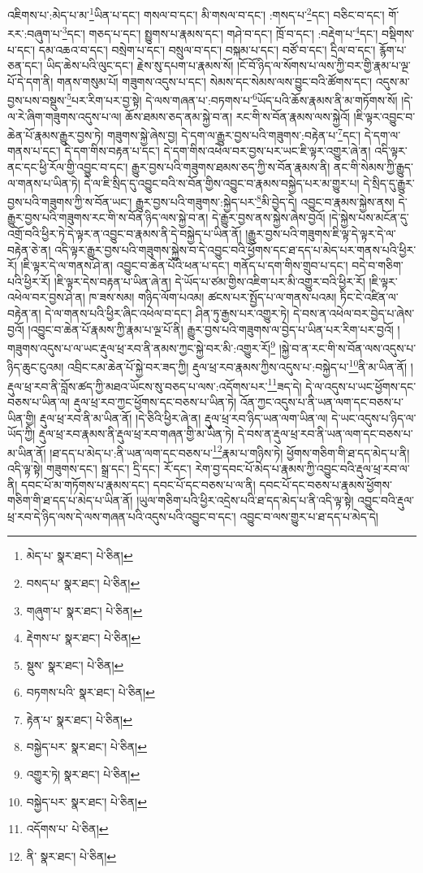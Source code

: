 འཇིགས་པ་:མེད་པ་མ་\footnote{མེད་པ་  སྣར་ཐང་།  པེ་ཅིན། }ཡིན་པ་དང་། གསལ་བ་དང་། མི་གསལ་བ་དང་། :གསད་པ་\footnote{བསད་པ་  སྣར་ཐང་།  པེ་ཅིན། }དང་། བཅིང་བ་དང་། གོ་རར་:བཞུག་པ་\footnote{གཞུག་པ་  སྣར་ཐང་།  པེ་ཅིན། }དང་། གཅད་པ་དང་། སྤྱུགས་པ་རྣམས་དང་། གཤེ་བ་དང་། ཁྲོ་བ་དང་། :བརྡེག་པ་\footnote{རྡེགས་པ་  སྣར་ཐང་།  པེ་ཅིན། }དང་། བསྡིགས་པ་དང་། དམ་འཆའ་བ་དང་། བསྲེག་པ་དང་། བསྲུལ་བ་དང་། བསྐམ་པ་དང་། བཙོ་བ་དང་། དྲིལ་བ་དང་། རྙོག་པ་ཅན་དང་། ཡིད་ཆེས་པའི་ལུང་དང་། རྗེས་སུ་དཔག་པ་རྣམས་སོ། །ངོ་བོ་ཉིད་ལ་སོགས་པ་ལས་ཀྱི་བར་གྱི་རྣམ་པ་ལྔ་པོ་དེ་དག་ནི། གནས་གསུམ་པོ། གཟུགས་འདུས་པ་དང་། སེམས་དང་སེམས་ལས་བྱུང་བའི་ཚོགས་དང་། འདུས་མ་བྱས་པས་བསྡུས་\footnote{སྡུས་  སྣར་ཐང་།  པེ་ཅིན། }པར་རིག་པར་བྱ་སྟེ། དེ་ལས་གཞན་པ་:བཏགས་པ་\footnote{བཏགས་པའི་  སྣར་ཐང་།  པེ་ཅིན། }ཡོད་པའི་ཆོས་རྣམས་ནི་མ་གཏོགས་སོ། །དེ་ལ་རེ་ཞིག་གཟུགས་འདུས་པ་ལ། ཆོས་ཐམས་ཅད་ནམ་སྐྱེ་བ་ན། རང་གི་ས་བོན་རྣམས་ལས་སྐྱེའོ། །ཇི་ལྟར་འབྱུང་བ་ཆེན་པོ་རྣམས་རྒྱུར་བྱས་ཏེ། གཟུགས་སྐྱེ་ཞེས་བྱ། དེ་དག་ལ་རྒྱུར་བྱས་པའི་གཟུགས་:བརྟེན་པ་\footnote{རྟེན་པ་  སྣར་ཐང་།  པེ་ཅིན། }དང་། དེ་དག་ལ་གནས་པ་དང་། དེ་དག་གིས་བརྟན་པ་དང་། དེ་དག་གིས་འཕེལ་བར་བྱས་པར་ཡང་ཇི་ལྟར་འགྱུར་ཞེ་ན། འདི་ལྟར་ནང་དང་ཕྱི་རོལ་གྱི་འབྱུང་བ་དང་། རྒྱུར་བྱས་པའི་གཟུགས་ཐམས་ཅད་ཀྱི་ས་བོན་རྣམས་ནི། ནང་གི་སེམས་ཀྱི་རྒྱུད་ལ་གནས་པ་ཡིན་ཏེ། དེ་ལ་ཇི་སྲིད་དུ་འབྱུང་བའི་ས་བོན་གྱིས་འབྱུང་བ་རྣམས་བསྐྱེད་པར་མ་གྱུར་པ། དེ་སྲིད་དུ་རྒྱུར་བྱས་པའི་གཟུགས་ཀྱི་ས་བོན་ཡང་། རྒྱུར་བྱས་པའི་གཟུགས་:སྐྱེད་པར་\footnote{བསྐྱེད་པར་  སྣར་ཐང་།  པེ་ཅིན། }མི་བྱེད་དེ། འབྱུང་བ་རྣམས་སྐྱེས་ནས། དེ་རྒྱུར་བྱས་པའི་གཟུགས་རང་གི་ས་བོན་ཉིད་ལས་སྐྱེ་བ་ན། དེ་རྒྱུར་བྱས་ནས་སྐྱེས་ཞེས་བྱའོ། །དེ་སྐྱེས་པས་མངོན་དུ་འགྲོ་བའི་ཕྱིར་ཏེ་དེ་ལྟར་ན་འབྱུང་བ་རྣམས་ནི་དེ་བསྐྱེད་པ་ཡིན་ནོ། །རྒྱུར་བྱས་པའི་གཟུགས་ཇི་ལྟ་དེ་ལྟར་དེ་ལ་བརྟེན་ཅེ་ན། འདི་ལྟར་རྒྱུར་བྱས་པའི་གཟུགས་སྐྱེས་བ་དེ་འབྱུང་བའི་ཕྱོགས་དང་ཐ་དད་པ་མེད་པར་གནས་པའི་ཕྱིར་རོ། །ཇི་ལྟར་དེ་ལ་གནས་ཤེ་ན། འབྱུང་བ་ཆེན་པོའི་ཕན་པ་དང་། གནོད་པ་དག་གིས་གྲུབ་པ་དང་། བདེ་བ་གཅིག་པའི་ཕྱིར་རོ། །ཇི་ལྟར་དེས་བརྟན་པ་ཡིན་ཞེ་ན། དེ་ཡོད་པ་ཙམ་གྱིས་འཇིག་པར་མི་འགྱུར་བའི་ཕྱིར་རོ། །ཇི་ལྟར་འཕེལ་བར་བྱས་ཤེ་ན། ཁ་ཟས་སམ། གཉིད་ལོག་པའམ། ཚངས་པར་སྤྱོད་པ་ལ་གནས་པའམ། ཏིང་ངེ་འཛིན་ལ་བརྟེན་ན། དེ་ལ་གནས་པའི་ཕྱིར་ཞིང་འཕེལ་བ་དང་། ཤིན་ཏུ་རྒྱས་པར་འགྱུར་ཏེ། དེ་བས་ན་འཕེལ་བར་བྱེད་པ་ཞེས་བྱའོ། །འབྱུང་བ་ཆེན་པོ་རྣམས་ཀྱི་རྣམ་པ་ལྔ་པོ་ནི། རྒྱུར་བྱས་པའི་གཟུགས་ལ་བྱེད་པ་ཡིན་པར་རིག་པར་བྱའོ། །གཟུགས་འདུས་པ་ལ་ཡང་རྡུལ་ཕྲ་རབ་ནི་ནམས་ཀྱང་སྐྱེ་བར་མི་:འགྱུར་རོ།\footnote{འགྱུར་ཏེ།  སྣར་ཐང་།  པེ་ཅིན། } །སྐྱེ་བ་ན་རང་གི་ས་བོན་ལས་འདུས་པ་ཉིད་ཆུང་ངུའམ། འབྲིང་ངམ་ཆེན་པོ་སྐྱེ་བར་ཟད་ཀྱི། རྡུལ་ཕྲ་རབ་རྣམས་ཀྱིས་འདུས་པ་:བསྐྱེད་པ་\footnote{བསྐྱེད་པར་  སྣར་ཐང་།  པེ་ཅིན། }ནི་མ་ཡིན་ནོ། །རྡུལ་ཕྲ་རབ་ནི་བློས་ཚད་ཀྱི་མཐའ་ཡོངས་སུ་བཅད་པ་ལས་:འདོགས་པར་\footnote{འདོགས་པ་  པེ་ཅིན། }ཟད་དེ། དེ་ལ་འདུས་པ་ཡང་ཕྱོགས་དང་བཅས་པ་ཡིན་ལ། རྡུལ་ཕྲ་རབ་ཀྱང་ཕྱོགས་དང་བཅས་པ་ཡིན་ཏེ། འོན་ཀྱང་འདུས་པ་ནི་ཡན་ལག་དང་བཅས་པ་ཡིན་གྱི། རྡུལ་ཕྲ་རབ་ནི་མ་ཡིན་ནོ། །དེ་ཅིའི་ཕྱིར་ཞེ་ན། རྡུལ་ཕྲ་རབ་ཉིད་ཡན་ལག་ཡིན་ལ། དེ་ཡང་འདུས་པ་ཉིད་ལ་ཡོད་ཀྱི། རྡུལ་ཕྲ་རབ་རྣམས་ནི་རྡུལ་ཕྲ་རབ་གཞན་གྱི་མ་ཡིན་ཏེ། དེ་བས་ན་རྡུལ་ཕྲ་རབ་ནི་ཡན་ལག་དང་བཅས་པ་མ་ཡིན་ནོ། །ཐ་དད་པ་མེད་པ་:ནི་ཡན་ལག་དང་བཅས་པ་\footnote{ནི་  སྣར་ཐང་།  པེ་ཅིན། }རྣམ་པ་གཉིས་ཏེ། ཕྱོགས་གཅིག་གི་ཐ་དད་མེད་པ་ནི། འདི་ལྟ་སྟེ། གཟུགས་དང་། སྒྲ་དང་། དྲི་དང་། རོ་དང་། རེག་བྱ་དབང་པོ་མེད་པ་རྣམས་ཀྱི་འབྱུང་བའི་རྡུལ་ཕྲ་རབ་ལ་ནི། དབང་པོ་མ་གཏོགས་པ་རྣམས་དང་། དབང་པོ་དང་བཅས་པ་ལ་ནི། དབང་པོ་དང་བཅས་པ་རྣམས་ཕྱོགས་གཅིག་གི་ཐ་དད་པ་མེད་པ་ཡིན་ནོ། །ཡུལ་གཅིག་པའི་ཕྱིར་འདྲེས་པའི་ཐ་དད་མེད་པ་ནི་འདི་ལྟ་སྟེ། འབྱུང་བའི་རྡུལ་ཕྲ་རབ་དེ་ཉིད་ལས་དེ་ལས་གཞན་པའི་འདུས་པའི་འབྱུང་བ་དང་། འབྱུང་བ་ལས་གྱུར་པ་ཐ་དད་པ་མེད་དེ། 